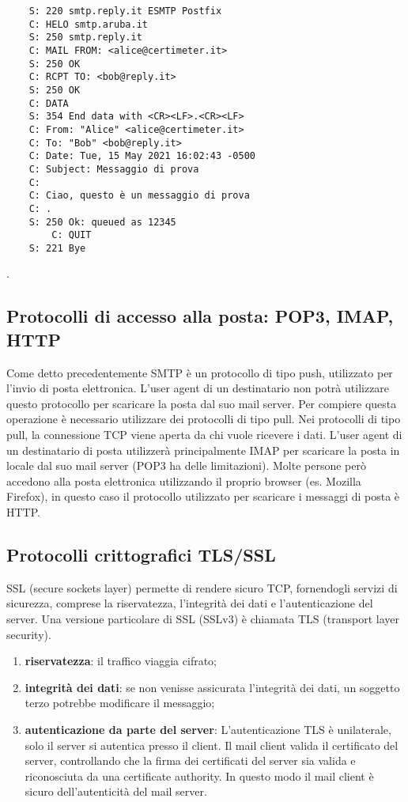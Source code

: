 \begin{verbatim}
    S: 220 smtp.reply.it ESMTP Postfix
    C: HELO smtp.aruba.it
    S: 250 smtp.reply.it
    C: MAIL FROM: <alice@certimeter.it>
    S: 250 OK
    C: RCPT TO: <bob@reply.it>
    S: 250 OK
    C: DATA
    S: 354 End data with <CR><LF>.<CR><LF>
    C: From: "Alice" <alice@certimeter.it>
    C: To: "Bob" <bob@reply.it>
    C: Date: Tue, 15 May 2021 16:02:43 -0500
    C: Subject: Messaggio di prova
    C: 
    C: Ciao, questo è un messaggio di prova
    C: .
    S: 250 Ok: queued as 12345
        C: QUIT
    S: 221 Bye
\end{verbatim}\cite{SMTP}.

\subsection{Protocolli di accesso alla posta: POP3, IMAP, HTTP}
Come detto precedentemente SMTP è un protocollo di tipo push, 
utilizzato per l’invio di posta elettronica. L’user agent di un destinatario non potrà utilizzare questo 
protocollo per scaricare la posta dal suo mail server. 
Per compiere questa operazione è necessario utilizzare dei protocolli di tipo pull. 
Nei protocolli di tipo pull, la connessione TCP viene aperta da chi vuole ricevere i dati. 
L’user agent di un destinatario di posta utilizzerà principalmente IMAP per scaricare la posta in locale 
dal suo mail server (POP3 ha delle limitazioni). 
Molte persone però accedono alla posta elettronica utilizzando il proprio browser (es. Mozilla Firefox), 
in questo caso il protocollo utilizzato per scaricare i messaggi di posta è HTTP.

\subsection{Protocolli crittografici TLS/SSL}
SSL (secure sockets layer) permette di rendere sicuro TCP,  fornendogli servizi di sicurezza, 
comprese la riservatezza, l’integrità dei dati e l’autenticazione del server. 
Una versione particolare di SSL (SSLv3) è chiamata TLS (transport layer security).\cite{tls}

\begin{enumerate}
    \item \textbf{riservatezza}: il traffico viaggia cifrato;
    \item \textbf{integrità dei dati}: se non venisse assicurata l'integrità dei dati, un soggetto terzo
    potrebbe modificare il messaggio;
    \item \textbf{autenticazione da parte del server}: L'autenticazione TLS è unilaterale, solo il server si 
    autentica presso il client. Il mail client valida il certificato del server, controllando che la firma dei 
    certificati del server sia valida e riconosciuta da una certificate authority.
    In questo modo il mail client è sicuro dell'autenticità del mail server. 
\end{enumerate}


